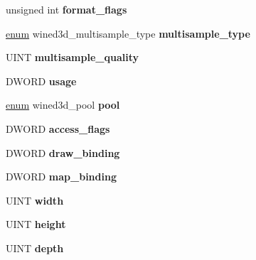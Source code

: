 \begin{DoxyCompactItemize}
unsigned int {\bfseries format\+\_\+flags}
\item 
\mbox{\label{structwined3d__resource_af866442ae31d9d6d2248eedd80c1a083}} 
\hyperlink{interfaceenum}{enum} wined3d\+\_\+multisample\+\_\+type {\bfseries multisample\+\_\+type}
\item 
\mbox{\label{structwined3d__resource_a08cf5c999031484bd4f4e40d07e2cd05}} 
U\+I\+NT {\bfseries multisample\+\_\+quality}
\item 
\mbox{\label{structwined3d__resource_a0483dcdac5f30be98bd70996d04462f2}} 
D\+W\+O\+RD {\bfseries usage}
\item 
\mbox{\label{structwined3d__resource_acc6253931a6d65892445b94b32243d37}} 
\hyperlink{interfaceenum}{enum} wined3d\+\_\+pool {\bfseries pool}
\item 
\mbox{\label{structwined3d__resource_ab33f260fdac29f06dda03dba8fba8071}} 
D\+W\+O\+RD {\bfseries access\+\_\+flags}
\item 
\mbox{\label{structwined3d__resource_af0b9a39d30426c0fa3f3acb45de9d442}} 
D\+W\+O\+RD {\bfseries draw\+\_\+binding}
\item 
\mbox{\label{structwined3d__resource_add16bb6f33d49fc82da03a17a247dc09}} 
D\+W\+O\+RD {\bfseries map\+\_\+binding}
\item 
\mbox{\label{structwined3d__resource_af636c5f7622fc71a6c729c1c42ef9def}} 
U\+I\+NT {\bfseries width}
\item 
\mbox{\label{structwined3d__resource_a1805389bbfa0a8bb0bae1496c342a1e4}} 
U\+I\+NT {\bfseries height}
\item 
\mbox{\label{structwined3d__resource_a7d31b311a219f5b36835a7ef80d0940e}} 
U\+I\+NT {\bfseries depth}
\item 
\mbox{\label{structwined3d__resource_a307400ea38fb1eb6194d168a46a1ed02}} 

\end{DoxyCompactItemize}
